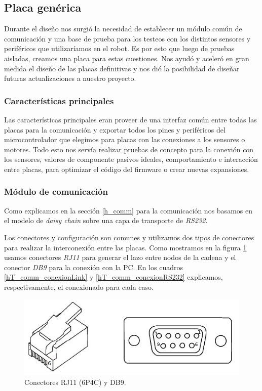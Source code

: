 \subsection{Placa gen\'erica}
\label{h_placas_generica}

Durante el dise\~no nos surgi\'o la necesidad de establecer un m\'odulo com\'un de comunicaci\'on y una base de prueba para
los testeos con los distintos sensores y perif\'ericos que utilizar\'iamos en el robot.
Es por esto que luego de pruebas aisladas, creamos una placa para estas cuestiones.
Nos ayud\'o y aceler\'o en gran medida el dise\~no de las placas definitivas y nos di\'o la posibilidad de dise\~nar futuras
actualizaciones a nuestro proyecto.

\subsubsection{Caracter\'isticas principales}
\label{h_placas_generica_caracteristicas}

Las caracter\'isticas principales eran proveer de una interfaz com\'un entre todas las placas para la comunicaci\'on y exportar
todos los pines y perif\'ericos del microcontrolador que elegimos para placas con las conexiones a los sensores o motores.
Todo esto nos serv\'ia realizar pruebas de concepto para la conexi\'on con los sensores, valores de componente pasivos ideales,
comportamiento e interacci\'on entre placas, para optimizar el c\'odigo del firmware o crear nuevas expansiones.

\subsubsection{M\'odulo de comunicaci\'on}
\label{h_placas_generica_comm}

Como explicamos en la secci\'on \ref{h_comm} para la comunicaci\'on nos basamos en el modelo de \emph{daisy chain} sobre una
capa de transporte de \emph{RS232}.

Los conectores y configuraci\'on son comunes y utilizamos dos tipos de conectores para realizar la interconexi\'on entre las placas.
Como mostramos en la figura \ref{hF_placa_gen_comm} usamos conectores \emph{RJ11} para generar el lazo entre nodos de la cadena y el
conector \emph{DB9} para la conexi\'on con la PC.
En los cuadros \ref{hT_comm_conexionLink} y \ref{hT_comm_conexionRS232} explicamos, respectivamente, el conexionado para cada caso.

\begin{figure}[ht]
	\centering
	\includegraphics[scale=.25]{figuras/rj11_db9.png}
	\caption{Conectores RJ11 (6P4C) y DB9.}
	\label{hF_placa_gen_comm}
\end{figure}

